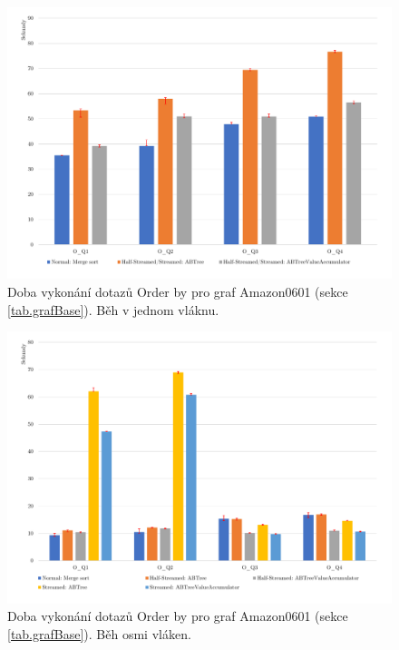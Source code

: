 \begin{figure}[!htp]
\includegraphics[width=\linewidth]{../img/amazonOrderByST.pdf}\centering
\caption{Doba vykonání dotazů Order by pro graf Amazon0601 (sekce \ref{tab.grafBase}). Běh v jednom vláknu.}
\label{figure.amazonOrderST}
\end{figure}
\begin{figure}[!htp]
\includegraphics[width=\linewidth]{../img/amazonOrderByPar.pdf}\centering
\caption{Doba vykonání dotazů Order by pro graf Amazon0601 (sekce \ref{tab.grafBase}).  Běh osmi vláken.}
\label{figure.amazonOrderPar}
\end{figure}

